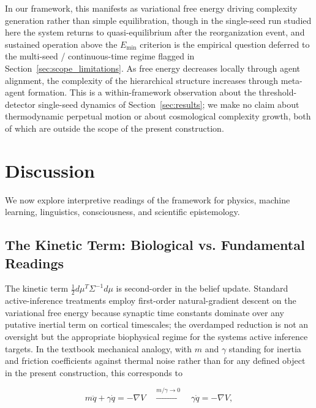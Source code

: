 \documentclass[11pt]{article}
\begin{document}
In our framework, this manifests as variational free energy driving complexity generation rather than simple equilibration, though in the single-seed run studied here the system returns to quasi-equilibrium after the reorganization event, and sustained operation above the $E_{\min}$ criterion is the empirical question deferred to the multi-seed / continuous-time regime flagged in Section~\ref{sec:scope_limitations}. As free energy decreases locally through agent alignment, the complexity of the hierarchical structure increases through meta-agent formation. This is a within-framework observation about the threshold-detector single-seed dynamics of Section~\ref{sec:results}; we make no claim about thermodynamic perpetual motion or about cosmological complexity growth, both of which are outside the scope of the present construction.

\section{Discussion}
\label{sec:implications}

We now explore interpretive readings of the framework for physics, machine learning, linguistics, consciousness, and scientific epistemology.

\subsection{The Kinetic Term: Biological vs. Fundamental Readings}

The kinetic term $\frac{1}{2}d\mu^T \Sigma^{-1} d\mu$ is second-order in the belief update. Standard active-inference treatments employ first-order natural-gradient descent on the variational free energy because synaptic time constants dominate over any putative inertial term on cortical timescales; the overdamped reduction is not an oversight but the appropriate biophysical regime for the systems active inference targets. In the textbook mechanical analogy, with $m$ and $\gamma$ standing for inertia and friction coefficients against thermal noise rather than for any defined object in the present construction, this corresponds to

\begin{equation}
m\ddot{q} + \gamma\dot{q} = -\nabla V \quad \xrightarrow{m/\gamma \to 0} \quad \gamma\dot{q} = -\nabla V,
\end{equation}
\end{document}
